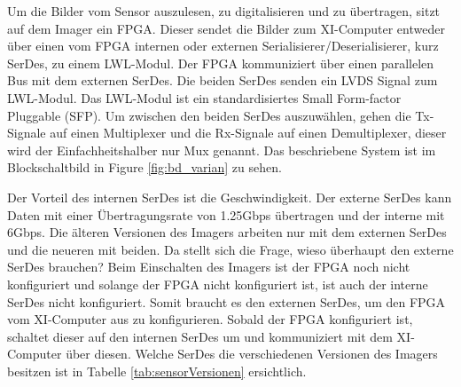 \documentclass{article}
\begin{document}
Um die Bilder vom Sensor auszulesen, zu digitalisieren und zu übertragen, sitzt auf dem Imager ein FPGA. Dieser sendet die Bilder zum XI-Computer ent\-weder über einen vom FPGA internen oder externen Serialisierer/Deserialisierer, kurz SerDes, zu einem LWL-Modul. Der FPGA kommuniziert über einen parallelen Bus mit dem externen SerDes. Die beiden SerDes senden ein LVDS Signal zum LWL-Modul. Das LWL-Modul ist ein standardisiertes Small Form-factor Pluggable (SFP). Um zwischen den beiden SerDes auszuwählen, gehen die Tx-Signale auf einen Multiplexer und die Rx-Signale auf einen Demultiplexer, dieser wird der Einfachheitshalber nur Mux genannt. Das beschriebene System ist im Blockschaltbild in Figure \ref{fig:bd_varian} zu sehen.

Der Vorteil des internen SerDes ist die Geschwindigkeit. Der externe SerDes kann Daten mit einer Übertragungsrate von 1.25Gbps übertragen und der interne mit 6Gbps. Die älteren Versionen des Imagers arbeiten nur mit dem externen SerDes und die neueren mit beiden. Da stellt sich die Frage, wieso überhaupt den externe SerDes brauchen? Beim Einschalten des Imagers ist der FPGA noch nicht konfiguriert und solange der FPGA nicht konfiguriert ist, ist auch der interne SerDes nicht konfiguriert. Somit braucht es den externen SerDes, um den FPGA vom XI-Computer aus zu konfigurieren. Sobald der FPGA konfiguriert ist, schaltet dieser auf den internen SerDes um und kommuniziert mit dem XI-Computer über diesen. Welche SerDes die verschiedenen Versionen des Imagers besitzen ist in Tabelle \ref{tab:sensorVersionen} ersichtlich.

\end{document}
